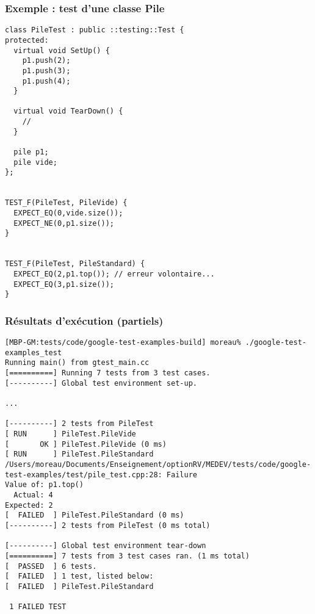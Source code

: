 \begin{frame}[fragile]
\frametitle{Exemple : test d'une classe Pile}
\begin{lstlisting}
class PileTest : public ::testing::Test {
protected:
  virtual void SetUp() {
    p1.push(2);
    p1.push(3);
    p1.push(4);
  }

  virtual void TearDown() {
    //
  }

  pile p1;
  pile vide;
};


TEST_F(PileTest, PileVide) {
  EXPECT_EQ(0,vide.size());
  EXPECT_NE(0,p1.size());
}


TEST_F(PileTest, PileStandard) {
  EXPECT_EQ(2,p1.top()); // erreur volontaire...
  EXPECT_EQ(3,p1.size());
}

\end{lstlisting}
\end{frame}

\begin{frame}[fragile]
\frametitle{Résultats d'exécution (partiels)}
{\tiny
\begin{verbatim}
[MBP-GM:tests/code/google-test-examples-build] moreau% ./google-test-examples_test
Running main() from gtest_main.cc
[==========] Running 7 tests from 3 test cases.
[----------] Global test environment set-up.

...

[----------] 2 tests from PileTest
[ RUN      ] PileTest.PileVide
[       OK ] PileTest.PileVide (0 ms)
[ RUN      ] PileTest.PileStandard
/Users/moreau/Documents/Enseignement/optionRV/MEDEV/tests/code/google-test-examples/test/pile_test.cpp:28: Failure
Value of: p1.top()
  Actual: 4
Expected: 2
[  FAILED  ] PileTest.PileStandard (0 ms)
[----------] 2 tests from PileTest (0 ms total)

[----------] Global test environment tear-down
[==========] 7 tests from 3 test cases ran. (1 ms total)
[  PASSED  ] 6 tests.
[  FAILED  ] 1 test, listed below:
[  FAILED  ] PileTest.PileStandard

 1 FAILED TEST
\end{verbatim}
}
\end{frame}

